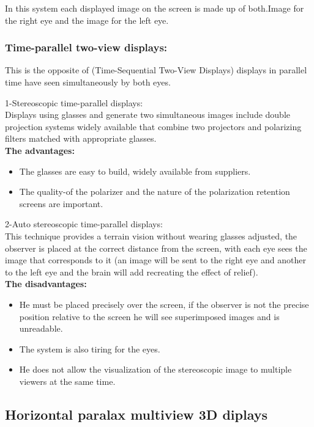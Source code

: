 In this system each displayed image on the screen is made up of both.Image for the right eye and the image for the left eye.
\subsubsection{Time-parallel two-view displays:}
This is the opposite of (Time-Sequential Two-View Displays) displays in parallel time have seen simultaneously by both eyes.

1-Stereoscopic time-parallel displays:\\
Displays using glasses and generate two simultaneous images include double projection systems widely available that combine two projectors and polarizing filters matched with appropriate glasses.\\
\textbf{The advantages:}
\begin{itemize}
\item The glasses are easy to build, widely available from suppliers.
\item The quality-of the polarizer and the nature of the polarization retention screens are important.
\end{itemize}

2-Auto stereoscopic time-parallel displays:\\
This technique provides a terrain vision without wearing glasses adjusted, the observer is placed at the correct distance from the screen, with each eye sees the image that corresponds to it (an image will be sent to the right eye and another to the left eye and the brain will add recreating the effect of relief).\\
\textbf{The disadvantages:}
\begin{itemize}
\item He must be placed precisely over the screen, if the observer is not the precise position relative to the screen he will see superimposed images and is unreadable.
\item The system is also tiring for the eyes.
\item He does not allow the visualization of the stereoscopic image to multiple viewers at the same time.
\end{itemize}


\subsection{Horizontal paralax multiview 3D diplays} 

